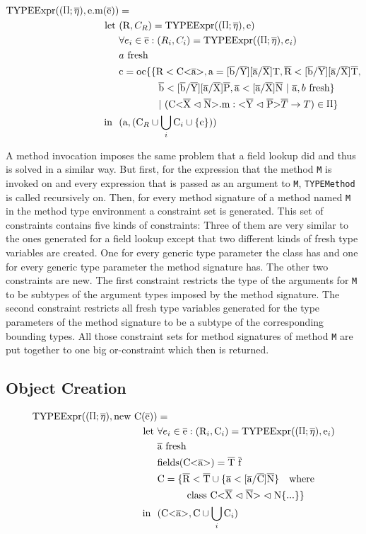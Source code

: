 \begin{align*}
    \texpr{\text{e.m}( \ot{e} )} &= \\
    \text{let} \ &( \text{R}, C_R ) = \texpr{\text{e}} \\
    &\forall{e_i} \in \ot{e} : ( R_i, C_i ) = \texpr{e_i} \\
    &\fresh{a} \\
    &\text{c} = \text{oc} \{ \{ \text{R} < \text{C<} \ot{a} \text{>}, \text{a} = \tsxsnd{b}{Y}{a}{X}{T}, \ot{R} < \tsxsnsd{b}{Y}{a}{X}{T}, \\
    & \quad \quad \quad \quad \ot{b} < \tsxsnsd{b}{Y}{a}{X}{P}, \ot{a} < \tsxsns{a}{X}{N} \ | \ \ot{a}, \fresh{b} \} \\
    & \quad \quad \quad \quad | \ ( \cm : \yp \oto{T} ) \in \sprod{0.7} \}\\
    \text{in} \ \ & (\text{a}, (\text{C}_R \cup \bigcup_{i} \text{C}_i \cup \{ \text{c} \} ))
\end{align*}

A method invocation imposes the same problem that a field lookup did and thus is solved in a similar way. But first, for the
expression that the method \verb|M| is invoked on and every expression that is passed as an argument to \verb|M|, \verb|TYPEMethod|
is called recursively on. Then, for every method signature of a method named \verb|M| in the method type environment a constraint
set is generated. This set of constraints contains five kinds of constraints: Three of them are very similar to the ones generated for a
field lookup except that two different kinds of fresh type variables are created. One for every generic type parameter the class has and
one for every generic type parameter the method signature has. The other two constraints are new. The first constraint restricts the type of the arguments for \verb|M| to be subtypes of the
argument types imposed by the method signature. The second constraint restricts all fresh type variables generated for the type parameters
of the method signature to be a subtype of the corresponding bounding types. All those constraint sets for method signatures of method \verb|M| are put together to one big or-constraint which then is returned.

\subsection{Object Creation}

\begin{align*}
    \texpr{\text{new} \ \text{C}(\ot{e})} &=\\
    \text{let} \ & \forall{e_i} \in \ot{e} : (\text{R}_i, \text{C}_i) = \texpr{\text{e}_i}\\
    & \fresh{\ot{a}}\\
    & \text{fields}(\nvt{C}{a}) = \ot{T} \ \ot{f}\\
    & \text{C} = \{ \ot{R} < \ot{T} \cup \{ \ot{a} < \tsxsns{a}{C}{N} \} \quad \text{where} \\
    & \quad \quad \quad \classheader \{ ... \} \}\\
    \text{in} \ \ & ( \nvt{C}{a}, \text{C} \cup \bigcup_{i} \text{C}_i )
\end{align*}

